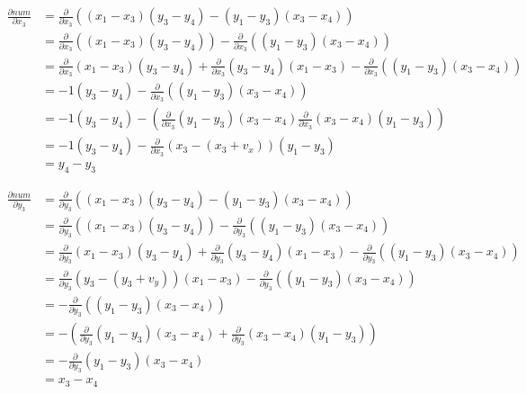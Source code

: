 \documentclass[fleqn]{article}
\begin{document}
\begin{equation}
\begin{aligned}
    \frac{\partial num}{\partial x_3}
    &= \frac{\partial}{\partial x_3} ((x_1 - x_3) (y_3 - y_4) - (y_1 - y_3) (x_3 - x_4)) \\
    &= \frac{\partial}{\partial x_3} ((x_1 - x_3) (y_3 - y_4)) - \frac{\partial}{\partial x_3} ((y_1 - y_3) (x_3 - x_4)) \\
    &= \frac{\partial}{\partial x_3} (x_1 - x_3) (y_3 - y_4) + \frac{\partial}{\partial x_3} (y_3 - y_4) (x_1 - x_3)
    - \frac{\partial}{\partial x_3} ((y_1 - y_3) (x_3 - x_4)) \\
    &= -1 (y_3 - y_4) - \frac{\partial}{\partial x_3} ((y_1 - y_3) (x_3 - x_4)) \\
    &= -1 (y_3 - y_4) - (\frac{\partial}{\partial x_3} (y_1 - y_3) (x_3 - x_4) \frac{\partial}{\partial x_3} (x_3 - x_4) (y_1 - y_3)) \\
    &= -1 (y_3 - y_4) - \frac{\partial}{\partial x_3} (x_3 - (x_3 + v_x)) (y_1 - y_3) \\
    &= y_4 - y_3
\end{aligned}
\end{equation}

\begin{equation}
\begin{aligned}
    \frac{\partial num}{\partial y_3}
    &= \frac{\partial}{\partial y_3} ((x_1 - x_3) (y_3 - y_4) - (y_1 - y_3) (x_3 - x_4)) \\
    &= \frac{\partial}{\partial y_3} ((x_1 - x_3) (y_3 - y_4)) - \frac{\partial}{\partial y_3} ((y_1 - y_3) (x_3 - x_4)) \\
    &= \frac{\partial}{\partial y_3} (x_1 - x_3) (y_3 - y_4) + \frac{\partial}{\partial y_3} (y_3 - y_4) (x_1 - x_3)
    - \frac{\partial}{\partial y_3} ((y_1 - y_3) (x_3 - x_4)) \\
    &= \frac{\partial}{\partial y_3} (y_3 - (y_3 + v_y)) (x_1 - x_3) - \frac{\partial}{\partial y_3} ((y_1 - y_3) (x_3 - x_4)) \\
    &= - \frac{\partial}{\partial y_3} ((y_1 - y_3) (x_3 - x_4)) \\
    &= - (\frac{\partial}{\partial y_3} (y_1 - y_3) (x_3 - x_4) + \frac{\partial}{\partial y_3} (x_3 - x_4) (y_1 - y_3)) \\
    &= - \frac{\partial}{\partial y_3} (y_1 - y_3) (x_3 - x_4) \\
    &= x_3 - x_4
\end{aligned}
\end{equation}
\end{document}
